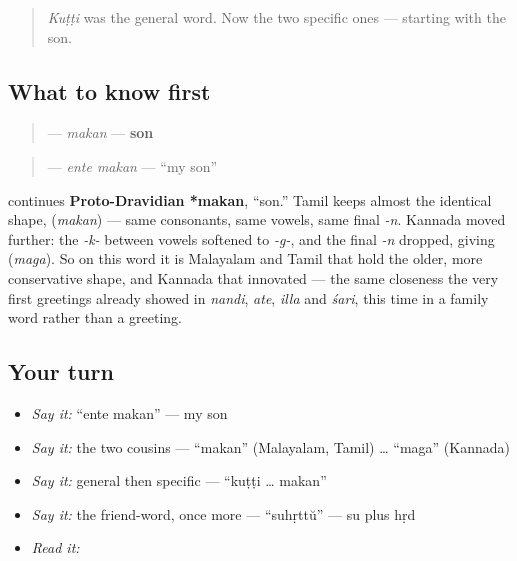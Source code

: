 \label{lesson:ML-C36-makan}



\begin{quote}
\emph{Kuṭṭi} was the general word. Now the two specific ones — starting with the son.
\end{quote}

\subsection*{What to know first}
\begin{quote}
\textbf{} — \emph{makan} — \textbf{son}
\end{quote}

\begin{quote}
\textbf{ } — \emph{ente makan} — \textquotedblleft{}my son\textquotedblright{}
\end{quote}

\begin{cousinweb}
\textbf{} continues \textbf{Proto-Dravidian *makan}, \textquotedblleft{}son.\textquotedblright{} Tamil keeps almost the identical shape, \textbf{} (\emph{makan}) — same consonants, same vowels, same final \emph{-n}. Kannada moved further: the \emph{-k-} between vowels softened to \emph{-g-}, and the final \emph{-n} dropped, giving \textbf{} (\emph{maga}). So on this word it is Malayalam and Tamil that hold the older, more conservative shape, and Kannada that innovated — the same closeness the very first greetings already showed in \emph{nandi}, \emph{ate}, \emph{illa} and \emph{śari}, this time in a family word rather than a greeting.
\end{cousinweb}

\subsection*{Your turn}
\begin{itemize}
\raggedright
  \item \emph{Say it:} \textquotedblleft{}ente makan\textquotedblright{} — my son
  \item \emph{Say it:} the two cousins — \textquotedblleft{}makan\textquotedblright{} (Malayalam, Tamil) … \textquotedblleft{}maga\textquotedblright{} (Kannada)
  \item \emph{Say it:} general then specific — \textquotedblleft{}kuṭṭi … makan\textquotedblright{}
  \item \emph{Say it:} the friend-word, once more — \textquotedblleft{}suhṛttŭ\textquotedblright{} — su plus hṛd
  \item \emph{Read it:} \textbf{}
\end{itemize}

